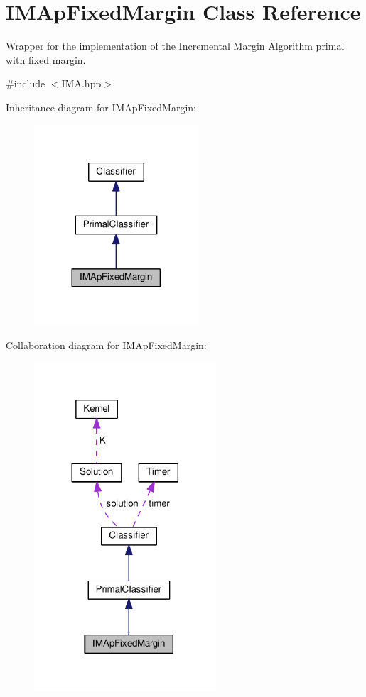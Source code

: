 \hypertarget{class_i_m_ap_fixed_margin}{}\section{I\+M\+Ap\+Fixed\+Margin Class Reference}
\label{class_i_m_ap_fixed_margin}


Wrapper for the implementation of the Incremental Margin Algorithm primal with fixed margin.  




{\ttfamily \#include $<$I\+M\+A.\+hpp$>$}



Inheritance diagram for I\+M\+Ap\+Fixed\+Margin\+:\nopagebreak
\begin{figure}[H]
\begin{center}
\leavevmode
\includegraphics[width=173pt]{class_i_m_ap_fixed_margin__inherit__graph}
\end{center}
\end{figure}


Collaboration diagram for I\+M\+Ap\+Fixed\+Margin\+:\nopagebreak
\begin{figure}[H]
\begin{center}
\leavevmode
\includegraphics[width=192pt]{class_i_m_ap_fixed_margin__coll__graph}
\end{center}
\end{figure}
